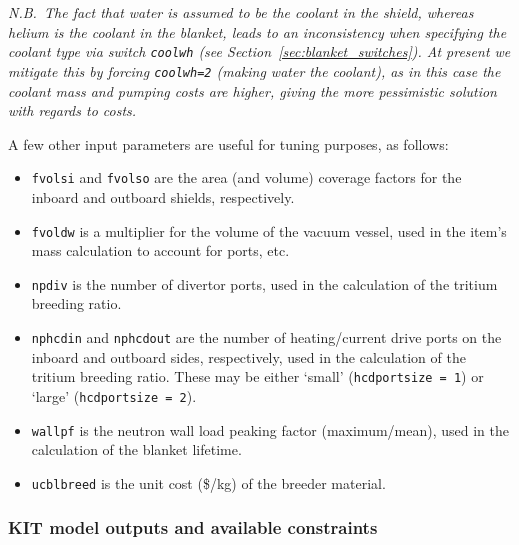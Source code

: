 \documentclass[11pt,a4paper]{report}
\begin{document}
\begin{itemize}
  \textit{N.B.\ The fact that water is assumed to be the coolant in the
    shield, whereas helium is the coolant in the blanket, leads to an
    inconsistency when specifying the coolant type via switch \texttt{coolwh}
    (see Section~\ref{sec:blanket_switches}). At present we mitigate this by
    forcing \texttt{coolwh=2} (making water the coolant), as in this case the
    coolant mass and pumping costs are higher, giving the more pessimistic
    solution with regards to costs.}

\end{itemize}

A few other input parameters are useful for tuning purposes, as follows:
\begin{itemize}

\item \texttt{fvolsi} and \texttt{fvolso} are the area (and volume) coverage
  factors for the inboard and outboard shields, respectively.

\item \texttt{fvoldw} is a multiplier for the volume of the vacuum vessel,
  used in the item's mass calculation to account for ports, etc.

\item \texttt{npdiv} is the number of divertor ports, used in the calculation
  of the tritium breeding ratio.

\item \texttt{nphcdin} and \texttt{nphcdout} are the number of heating/current
  drive ports on the inboard and outboard sides, respectively, used in the
  calculation of the tritium breeding ratio. These may be either `small'
  (\texttt{hcdportsize = 1}) or `large' (\texttt{hcdportsize = 2}).

\item \texttt{wallpf} is the neutron wall load peaking factor (maximum/mean),
  used in the calculation of the blanket lifetime.

\item \texttt{ucblbreed} is the unit cost (\$/kg) of the breeder material.

\end{itemize}

\subsubsection*{KIT model outputs and available constraints}
\end{document}
